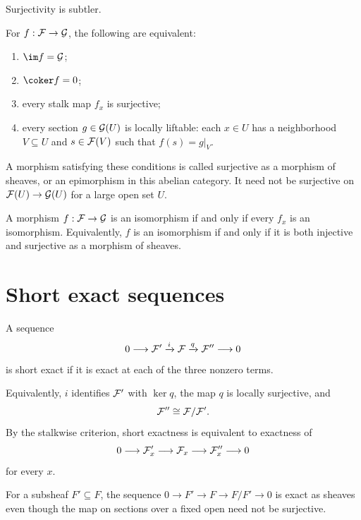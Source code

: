 Surjectivity is subtler.

\begin{theorem}\label{thm:vi16-epi-local}
For $f:\mathcal F\to\mathcal G$, the following are equivalent:
\begin{enumerate}
\item $\im f=\G$;
\item $\coker f=0$;
\item every stalk map $f_x$ is surjective;
\item every section $g\in\mathcal G(U)$ is locally liftable: each $x\in U$ has a neighborhood
$V\subseteq U$ and $s\in\mathcal F(V)$ such that $f(s)=g|_V$.
\end{enumerate}
\end{theorem}

A morphism satisfying these conditions is called surjective as a morphism of sheaves, or an
epimorphism in this abelian category.  It need not be surjective on $\mathcal F(U)\to\mathcal G(U)$ for a
large open set $U$.



\begin{corollary}
A morphism $f:\mathcal F\to\mathcal G$ is an isomorphism if and only if every $f_x$ is an isomorphism.
Equivalently, $f$ is an isomorphism if and only if it is both injective and surjective as a
morphism of sheaves.
\end{corollary}

\section{Short exact sequences}

\begin{definition}
A sequence
\[
0\longrightarrow\mathcal F'\xrightarrow{i}\mathcal F\xrightarrow{q}\mathcal F''\longrightarrow0
\]
is short exact if it is exact at each of the three nonzero terms.
\end{definition}

Equivalently, $i$ identifies $\mathcal F'$ with $\ker q$, the map $q$ is locally surjective, and
\[
\mathcal F''\cong\mathcal F/\mathcal F'.
\]
By the stalkwise criterion, short exactness is equivalent to exactness of
\[
0\longrightarrow\mathcal F'_x\longrightarrow\mathcal F_x\longrightarrow\mathcal F''_x\longrightarrow0
\]
for every $x$.



\begin{example}\label{ex:vi16-expand-02}
For a subsheaf $F'\subseteq F$, the sequence $0\to F'\to F\to F/F'\to0$ is exact as sheaves even though the map on sections over a fixed open need not be surjective.
\end{example}
